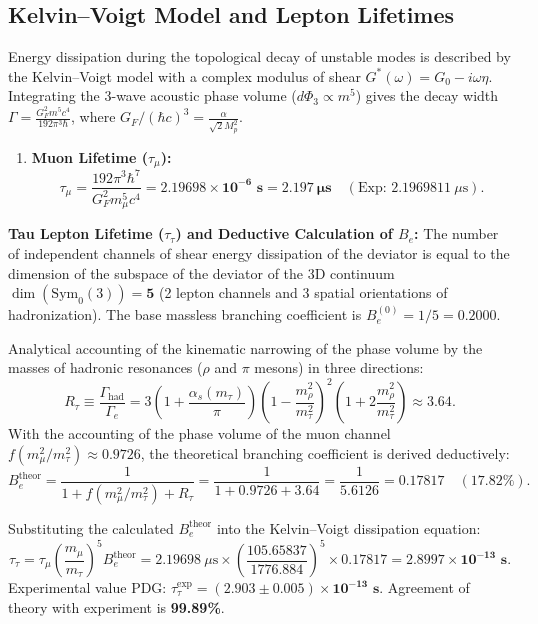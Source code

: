 \documentclass[12pt,a4paper]{article}
\begin{document}
\subsection{Kelvin--Voigt Model and Lepton Lifetimes}
	Energy dissipation during the topological decay of unstable modes is described by the Kelvin--Voigt model with a complex modulus of shear $G^*(\omega) = G_0 - i\omega\eta$. Integrating the 3-wave acoustic phase volume ($d\Phi_3 \propto m^5$) gives the decay width $\Gamma = \frac{G_F^2 m^5 c^4}{192 \pi^3 \hbar}$, where $G_F / (\hbar c)^3 = \frac{\alpha}{\sqrt{2} M_p^2}$.
													
\begin{enumerate}
\item \textbf{Muon Lifetime ($\tau_\mu$):}
\begin{equation}
\tau_\mu = \frac{192 \pi^3 \hbar^7}{G_F^2 m_\mu^5 c^4} = \mathbf{2.19698 \times 10^{-6} \text{ s}} = \mathbf{2.197 \ \mu\text{s}} \quad (\text{Exp: } 2.1969811 \ \mu\text{s}).
\end{equation}
\end{enumerate}
														
\textbf{Tau Lepton Lifetime ($\tau_\tau$) and Deductive Calculation of $B_e$:}
The number of independent channels of shear energy dissipation of the deviator is equal to the dimension of the subspace of the deviator of the 3D continuum $\dim(\mathrm{Sym}_0(3)) = \mathbf{5}$ (2 lepton channels and 3 spatial orientations of hadronization). The base massless branching coefficient is $B_e^{(0)} = 1/5 = 0.2000$.

Analytical accounting of the kinematic narrowing of the phase volume by the masses of hadronic resonances ($\rho$ and $\pi$ mesons) in three directions:
\begin{equation}
R_\tau \equiv \frac{\Gamma_{\text{had}}}{\Gamma_e} = 3 \left( 1 + \frac{\alpha_s(m_\tau)}{\pi} \right) \left( 1 - \frac{m_\rho^2}{m_\tau^2} \right)^2 \left( 1 + 2\frac{m_\rho^2}{m_\tau^2} \right) \approx 3.64.
\end{equation}
With the accounting of the phase volume of the muon channel $f(m_\mu^2/m_\tau^2) \approx 0.9726$, the theoretical branching coefficient is derived deductively:
\begin{equation}
B_e^{\text{theor}} = \frac{1}{1 + f(m_\mu^2/m_\tau^2) + R_\tau} = \frac{1}{1 + 0.9726 + 3.64} = \frac{1}{5.6126} = \mathbf{0.17817} \quad (\mathbf{17.82\%}).
\end{equation}
														
Substituting the calculated $B_e^{\text{theor}}$ into the Kelvin--Voigt dissipation equation:
\begin{equation}
\tau_\tau = \tau_\mu \left( \frac{m_\mu}{m_\tau} \right)^5 B_e^{\text{theor}} = 2.19698 \ \mu\text{s} \times \left( \frac{105.65837}{1776.884} \right)^5 \times 0.17817 = \mathbf{2.8997 \times 10^{-13} \text{ s}}.
\end{equation}
Experimental value PDG: $\tau_\tau^{\text{exp}} = \mathbf{(2.903 \pm 0.005) \times 10^{-13} \text{ s}}$. Agreement of theory with experiment is \textbf{99.89\%}.
														
\end{document}
